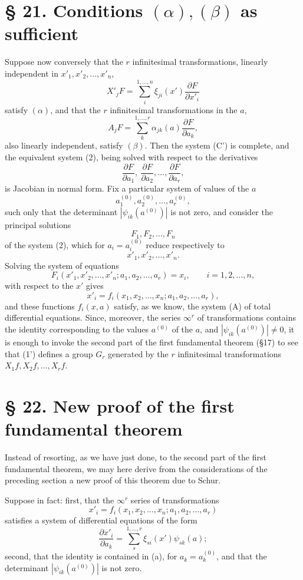 \documentclass[11pt]{book}
\begin{document}
\section*{\S{} 21. Conditions $(\alpha),(\beta)$ as sufficient}

Suppose now conversely that the $r$ infinitesimal transformations, linearly independent in $x'_1,x'_2,\ldots,x'_n$,
\[
 X'_jF=\sum\limits_i^{1,\ldots,n}\xi_{ji}(x')\frac{\partial F}{\partial x'_i}
\]
satisfy $(\alpha)$, and that the $r$ infinitesimal transformations in the $a$,
\[
 A_jF=\sum\limits_k^{1,\ldots,r}\alpha_{jk}(a)\frac{\partial F}{\partial a_k},
\]
also linearly independent, satisfy $(\beta)$. Then the system (C') is complete, and the equivalent system (2), being solved with respect to the derivatives
\[
 \frac{\partial F}{\partial a_1},\ \frac{\partial F}{\partial a_2},\ldots,\frac{\partial F}{\partial a_r},
\]
is Jacobian in normal form. Fix a particular system of values of the $a$
\[
 a_1^{(0)},a_2^{(0)},\ldots,a_r^{(0)},
\]
such only that the determinant $|\psi_{ik}(a^{(0)})|$ is not zero, and consider the principal solutions
\[
 F_1,F_2,\ldots,F_n
\]
of the system (2), which for $a_i=a_i^{(0)}$ reduce respectively to
\[
 x'_1,x'_2,\ldots,x'_n.
\]
Solving the system of equations
\[
 F_i(x'_1,x'_2,\ldots,x'_n; a_1,a_2,\ldots,a_r)=x_i,\qquad i=1,2,\ldots,n,
\]
with respect to the $x'$ gives
\begin{equation*}\tag{1'}
 x'_i=f_i(x_1,x_2,\ldots,x_n; a_1,a_2,\ldots,a_r),
\end{equation*}
and these functions $f_i(x,a)$ satisfy, as we know, the system (A) of total differential equations. Since, moreover, the series $\infty^r$ of transformations contains the identity corresponding to the values $a^{(0)}$ of the $a$, and $|\psi_{ik}(a^{(0)})|\ne0$, it is enough to invoke the second part of the first fundamental theorem (\S{}17) to see that (1') defines a group $G_r$ generated by the $r$ infinitesimal transformations $X_1f,X_2f,\ldots,X_rf$.

\section*{\S{} 22. New proof of the first fundamental theorem}

Instead of resorting, as we have just done, to the second part of the first fundamental theorem, we may here derive from the considerations of the preceding section a new proof of this theorem due to Schur.

Suppose in fact: first, that the $\infty^r$ series of transformations
\begin{equation*}\tag{a}
 x'_i=f_i(x_1,x_2,\ldots,x_n; a_1,a_2,\ldots,a_r)
\end{equation*}
satisfies a system of differential equations of the form
\begin{equation*}\tag{b}
 \frac{\partial x'_i}{\partial a_k}=\sum\limits_s^{1,\ldots,r}\xi_{si}(x')\psi_{sk}(a);
\end{equation*}
second, that the identity is contained in (a), for $a_k=a_k^{(0)}$, and that the determinant $|\psi_{ik}(a^{(0)})|$ is not zero.
\end{document}
